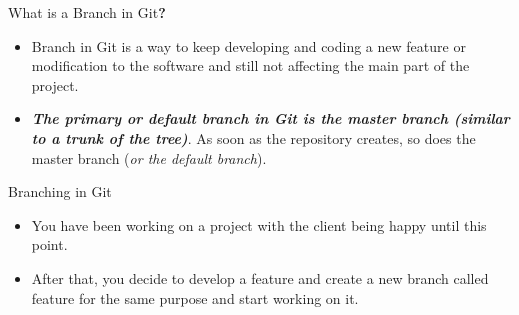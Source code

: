 \documentclass[aspectratio=169,11pt,t]{beamer}
\begin{document}
\begin{frame}{What is a Branch in Git\textbf{?}}
  \vskip2mm
  \begin{itemize}
    \item Branch in Git is a way to keep developing and coding a new feature or modification to
          the software and still not affecting the main part of the project.
  \end{itemize}
  \vskip2mm
  \centering
  \vskip2mm
  \raggedright
  \begin{itemize}
    \item \textbf{\emph{The primary or default branch in Git is the master branch (similar to a
          trunk of the tree)}}. As soon as the repository creates, so does the master branch
          (\emph{or the default branch}).
  \end{itemize}
\end{frame}

\begin{frame}{Branching in Git}
  \begin{itemize}
    \item You have been working on a project with the client being happy until this point.
  \end{itemize}
  \centering
  \raggedright
  \begin{itemize}
    \item After that, you decide to develop a feature and create a new branch called feature for
          the same purpose and start working on it.
  \end{itemize}
  \centering
\end{frame}
\end{document}
